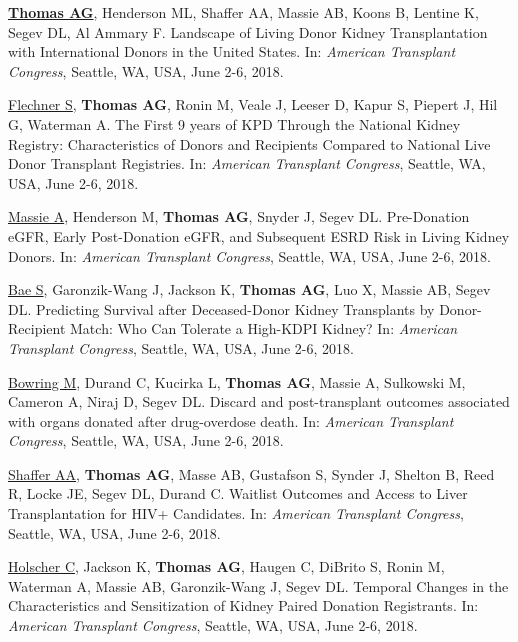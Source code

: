 \documentclass[10pt]{article}
\makeatletter
\newlength{\bibhang}
\newlength{\bibsep}
 {\@listi \global\bibsep\itemsep \global\advance\bibsep by\parsep}
\newenvironment{bibenum*}
  {\renewcommand\labelenumi{[\theenumi]}%
   \etaremune[
     topsep=0pt,
     itemsep=\bibsep,
     parsep=0pt,partopsep=0pt,
     itemindent=-\bibhang,
     leftmargin={\bibhang+\widthof{[999]}}]}
  {\endetaremune}
\makeatother
\begin{document}
\begin{bibenum*}
\item \underline{\textbf{Thomas AG}}, Henderson ML, Shaffer AA,
  Massie AB, Koons B, Lentine K, Segev DL, Al Ammary F.
  Landscape of Living Donor Kidney Transplantation with
  International Donors in the United States.
  In: \emph{American Transplant Congress},
  Seattle, WA, USA, June 2-6, 2018.

\item \underline{Flechner S}, \textbf{Thomas AG}, Ronin M,
  Veale J, Leeser D, Kapur S, Piepert J, Hil G, Waterman A.
  The First 9 years of KPD Through the National Kidney Registry:
  Characteristics of Donors and Recipients Compared to
  National Live Donor Transplant Registries.
  In: \emph{American Transplant Congress},
  Seattle, WA, USA, June 2-6, 2018.

\item \underline{Massie A}, Henderson M, \textbf{Thomas AG},
  Snyder J, Segev DL. Pre-Donation eGFR, Early Post-Donation eGFR,
  and Subsequent ESRD Risk in Living Kidney Donors.
  In: \emph{American Transplant Congress},
  Seattle, WA, USA, June 2-6, 2018.

\item \underline{Bae S}, Garonzik-Wang J, Jackson K, \textbf{Thomas AG},
  Luo X, Massie AB, Segev DL.
  Predicting Survival after Deceased-Donor Kidney Transplants by
  Donor-Recipient Match: Who Can Tolerate a High-KDPI Kidney?
  In: \emph{American Transplant Congress},
  Seattle, WA, USA, June 2-6, 2018.

\item \underline{Bowring M}, Durand C, Kucirka L, \textbf{Thomas AG},
  Massie A, Sulkowski M, Cameron A, Niraj D, Segev DL.
  Discard and post-transplant outcomes associated with organs
  donated after drug-overdose death.
  In: \emph{American Transplant Congress},
  Seattle, WA, USA, June 2-6, 2018.

\item \underline{Shaffer AA}, \textbf{Thomas AG}, Masse AB, Gustafson S,
  Synder J, Shelton B, Reed R, Locke JE, Segev DL, Durand C.
  Waitlist Outcomes and Access to Liver Transplantation for HIV+ Candidates.
  In: \emph{American Transplant Congress},
  Seattle, WA, USA, June 2-6, 2018.

\item \underline{Holscher C}, Jackson K, \textbf{Thomas AG}, Haugen C,
  DiBrito S, Ronin M, Waterman A, Massie AB, Garonzik-Wang J, Segev DL.
  Temporal Changes in the Characteristics and
  Sensitization of Kidney Paired Donation Registrants.
  In: \emph{American Transplant Congress},
  Seattle, WA, USA, June 2-6, 2018.


\end{bibenum*}
\end{document}

